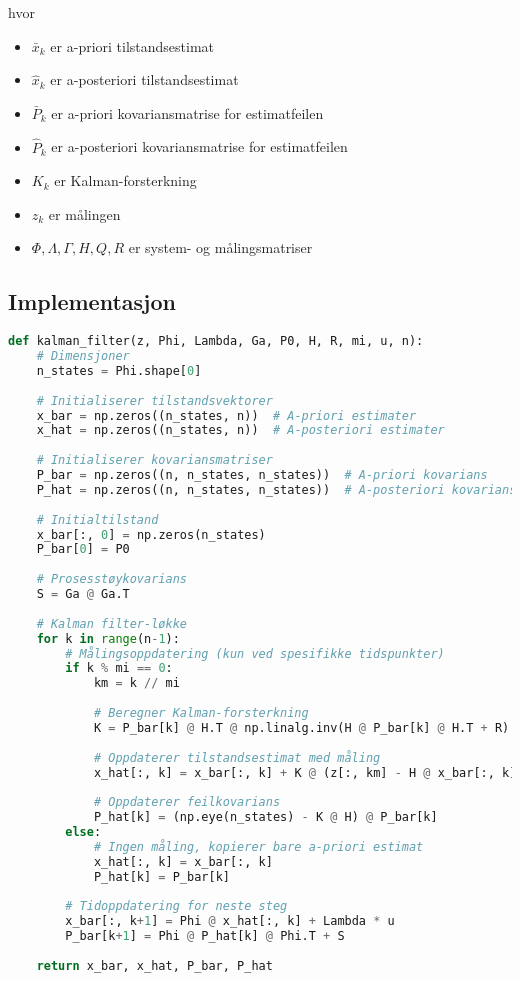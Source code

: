 \documentclass[a4paper,12pt]{article}
\theoremstyle{plain}
\begin{document}
hvor
\begin{itemize}
    \item $\bar{x}_k$ er a-priori tilstandsestimat
    \item $\hat{x}_k$ er a-posteriori tilstandsestimat
    \item $\bar{P}_k$ er a-priori kovariansmatrise for estimatfeilen
    \item $\hat{P}_k$ er a-posteriori kovariansmatrise for estimatfeilen
    \item $K_k$ er Kalman-forsterkning
    \item $z_k$ er målingen
    \item $\Phi, \Lambda, \Gamma, H, Q, R$ er system- og målingsmatriser
\end{itemize}
\clearpage
\subsection{Implementasjon}

\begin{lstlisting}[language=Python, caption=Implementasjon av Kalman filter]
def kalman_filter(z, Phi, Lambda, Ga, P0, H, R, mi, u, n):
    # Dimensjoner
    n_states = Phi.shape[0]
    
    # Initialiserer tilstandsvektorer
    x_bar = np.zeros((n_states, n))  # A-priori estimater
    x_hat = np.zeros((n_states, n))  # A-posteriori estimater
    
    # Initialiserer kovariansmatriser
    P_bar = np.zeros((n, n_states, n_states))  # A-priori kovarians
    P_hat = np.zeros((n, n_states, n_states))  # A-posteriori kovarians
    
    # Initialtilstand
    x_bar[:, 0] = np.zeros(n_states)
    P_bar[0] = P0
    
    # Prosesstøykovarians
    S = Ga @ Ga.T
    
    # Kalman filter-løkke
    for k in range(n-1):
        # Målingsoppdatering (kun ved spesifikke tidspunkter)
        if k % mi == 0:
            km = k // mi
            
            # Beregner Kalman-forsterkning
            K = P_bar[k] @ H.T @ np.linalg.inv(H @ P_bar[k] @ H.T + R)
            
            # Oppdaterer tilstandsestimat med måling
            x_hat[:, k] = x_bar[:, k] + K @ (z[:, km] - H @ x_bar[:, k])
            
            # Oppdaterer feilkovarians
            P_hat[k] = (np.eye(n_states) - K @ H) @ P_bar[k]
        else:
            # Ingen måling, kopierer bare a-priori estimat
            x_hat[:, k] = x_bar[:, k]
            P_hat[k] = P_bar[k]
        
        # Tidoppdatering for neste steg
        x_bar[:, k+1] = Phi @ x_hat[:, k] + Lambda * u
        P_bar[k+1] = Phi @ P_hat[k] @ Phi.T + S
    
    return x_bar, x_hat, P_bar, P_hat
\end{lstlisting}
\end{document}

